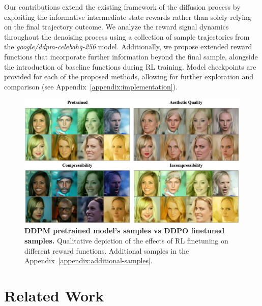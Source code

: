 \noindent Our contributions extend the existing framework of the diffusion process by exploiting the informative intermediate state rewards rather than solely relying on the final trajectory outcome. We analyze the reward signal dynamics throughout the denoising process using a collection of sample trajectories from the \textit{google/ddpm-celebahq-256} model. Additionally, we propose extended reward functions that incorporate further information beyond the final sample, alongside the introduction of baseline functions during RL training. Model checkpoints are provided for each of the proposed methods, allowing for further exploration and comparison (see Appendix~\ref{appendix:implementation}). \\


\begin{figure}[ht]
  \centering
  \includegraphics[scale=0.72]{img/results/visual-comparison-results-200dpi.png}
  \vspace{-4pt}  %
    \captionsetup{width=\textwidth} %
    \caption{\textbf{DDPM pretrained model's samples vs DDPO finetuned samples.} Qualitative depiction of the effects of RL finetuning on different reward functions. Additional samples in the Appendix~\ref{appendix:additional-samples}.}
    \label{fig:visual-comparison-ddpo}
\end{figure}

\section{Related Work}

